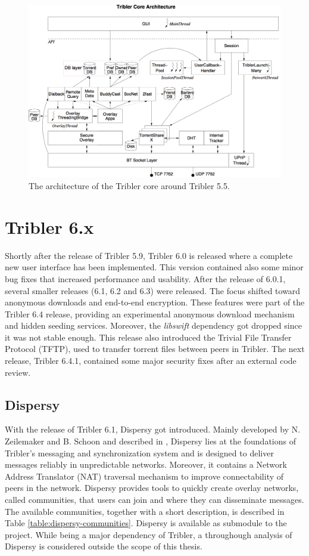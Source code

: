 \begin{figure}[h!]
	\centering
	\includegraphics[width=1.0\columnwidth]{images/architecture/core_architecture_55}
	\caption{The architecture of the Tribler core around Tribler 5.5.}
	\label{fig:tribler-core-architecture-55}
\end{figure}

\section{Tribler 6.x}
Shortly after the release of Tribler 5.9, Tribler 6.0 is released where a complete new user interface has been implemented. This version contained also some minor bug fixes that increased performance and usability. After the release of 6.0.1, several smaller releases (6.1, 6.2 and 6.3) were released. The focus shifted toward anonymous downloads and end-to-end encryption. These features were part of the Tribler 6.4 release, providing an experimental anonymous download mechanism and hidden seeding services. Moreover, the \emph{libswift} dependency got dropped since it was not stable enough. This release also introduced the Trivial File Transfer Protocol (TFTP), used to transfer torrent files between peers in Tribler. The next release, Tribler 6.4.1, contained some major security fixes after an external code review.

\subsection{Dispersy}
With the release of Tribler 6.1, Dispersy got introduced. Mainly developed by N. Zeilemaker and B. Schoon and described in \cite{zeilemaker2013dispersy}, Dispersy lies at the foundations of Tribler's messaging and synchronization system and is designed to deliver messages reliably in unpredictable networks. Moreover, it contains a Network Address Translator (NAT) traversal mechanism to improve connectability of peers in the network. Dispersy provides tools to quickly create overlay networks, called communities, that users can join and where they can disseminate messages. The available communities, together with a short description, is described in Table \ref{table:dispersy-communities}. Dispersy is available as submodule to the project. While being a major dependency of Tribler, a throughough analysis of Dispersy is considered outside the scope of this thesis.

